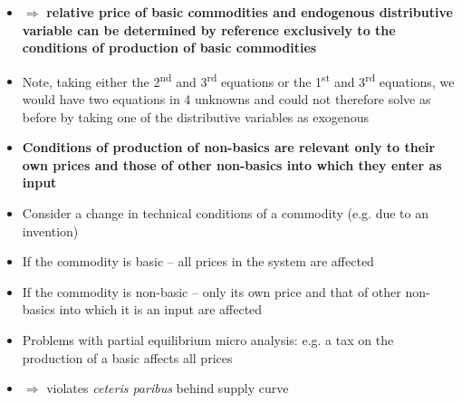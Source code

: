 \documentclass{article}
\begin{document}
\begin{itemize}
		\item \( \Rightarrow \) \textbf{relative price of basic commodities and endogenous distributive variable can be determined by reference exclusively to the conditions of production of basic commodities}
		\item Note, taking either the 2\textsuperscript{nd} and 3\textsuperscript{rd} equations or the 1\textsuperscript{st} and 3\textsuperscript{rd} equations, we would have two equations in 4 unknowns and could not therefore solve as before by taking  one of the distributive variables as exogenous
		\item \textbf{Conditions of production of non-basics are relevant only to their own prices and those of other non-basics into which they enter as input}
		\item Consider a change in technical conditions of a commodity (e.g. due to an invention)
		\item If the commodity is basic -- all prices in the system are affected
		\item If the commodity is non-basic -- only its own price and that of other non-basics into which it is an input are affected
		\item Problems with partial equilibrium micro analysis: e.g. a tax on the production of a basic affects all prices
		\item \( \Rightarrow \) violates \textit{ceteris paribus} behind supply curve
	\end{itemize}
\end{document}
